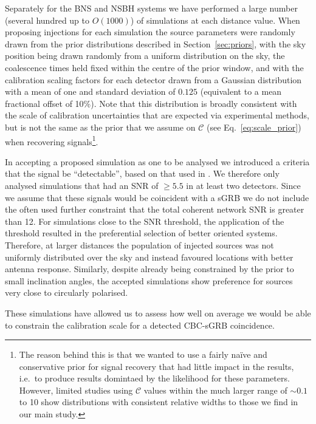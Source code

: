 \documentclass[prd, twocolumn, lengthcheck, superscriptaddress, showpacs, letterpaper, nofootinbib]{revtex4-1}
\newcommand{\scf}{\ensuremath{\mathcal{C}}}
\begin{document}
Separately for the \ac{BNS} and \ac{NSBH} systems we have performed a large
number (several hundred up to $O(1000)$) of simulations at each distance value.
When proposing injections for each simulation the source parameters were
randomly drawn from the prior distributions described in
Section~\ref{sec:priors}, with the sky position being drawn randomly from a
uniform distribution on the sky, the coalescence times held fixed within the
centre of the prior window, and with the calibration scaling factors for each
detector drawn from a Gaussian distribution with a mean of one and standard
deviation of $0.125$ (equivalent to a mean fractional offset of 10\%).  Note
that this distribution is broadly consistent with the scale of calibration
uncertainties that are expected via experimental methods, but is not the same as
the prior that we assume on $\scf$ (see Eq.~\ref{eq:scale_prior}) when recovering 
signals\footnote{The reason behind this is that we wanted to use a fairly na\"{i}ve and
conservative prior for signal recovery that had little impact in the results, i.e.\
to produce results domintaed by the likelihood for these parameters. However,
limited studies using $\scf$ values within the much larger range of
$\sim 0.1$ to 10 show distributions with consistent relative widths to
those we find in our main study.}. 

In accepting a proposed simulation as one to be analysed we introduced a
criteria that the signal be ``detectable'', based on that used in
\cite{2012PhRvD..85h2002A}. We therefore only analysed simulations that had an
\ac{SNR} of $\geq 5.5$ in at least two detectors. Since we assume that these
signals would be coincident with a \ac{sGRB} we do not include the often used
further constraint that the total coherent network \ac{SNR} is greater than 12.
For simulations close to the \ac{SNR} threshold, the application of the
threshold resulted in the preferential selection of better oriented systems.
Therefore, at larger distances the population of injected
sources was not uniformly distributed over the sky and instead favoured locations with better
antenna response.  Similarly, despite already being constrained by the prior to
small inclination angles, the accepted simulations show preference for sources
very close to circularly polarised.

These simulations have allowed us to assess how well on average we would be
able to constrain the calibration scale for a detected \ac{CBC}-\ac{sGRB}
coincidence.
\end{document}
